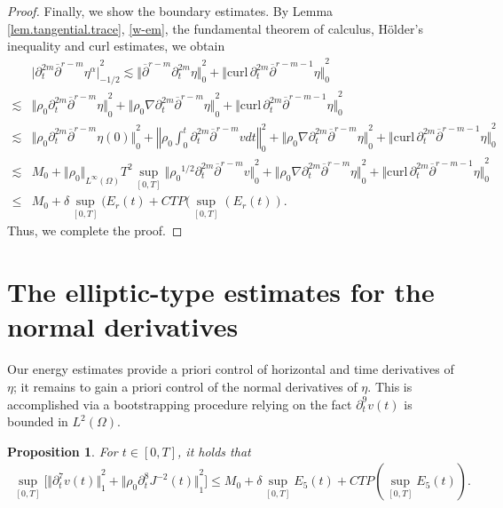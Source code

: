 \documentclass[12pt,twoside,reqno]{amsart}
\numberwithin{equation}{section}
\newtheorem{proposition}[theorem]{Proposition}
\theoremstyle{definition}
\theoremstyle{remark}
\begin{document}
\begin{proof}
Finally, we show the boundary estimates.
By Lemma \ref{lem.tangential.trace}, \eqref{w-em}, the fundamental theorem of calculus, H\"older's inequality and curl estimates, we obtain
\begin{align*}
  &{\vert{{\partial}_t^{2m}{\overline{\partial}}^{r-m} \eta^\alpha}\vert}_{-1/2}^2\lesssim {\Vert{{\overline{\partial}}^{r-m} {\partial}_t^{2m}\eta}\Vert}_0^2+{\Vert{{\mathrm{curl}\,}{\partial}_t^{2m}{\overline{\partial}}^{r-m-1}\eta}\Vert}_0^2\\
  \lesssim &{\Vert{{\rho_0}  {\partial}_t^{2m}{\overline{\partial}}^{r-m} \eta}\Vert}_0^2+{\Vert{{\rho_0} {\nabla}{\partial}_t^{2m}{\overline{\partial}}^{r-m} \eta}\Vert}_0^2+{\Vert{{\mathrm{curl}\,}{\partial}_t^{2m}{\overline{\partial}}^{r-m-1}\eta}\Vert}_0^2\\
  \lesssim & {\Vert{{\rho_0}  {\partial}_t^{2m}{\overline{\partial}}^{r-m} \eta(0)}\Vert}_0^2+{\left\Vert{{\rho_0} \int_0^t{\partial}_t^{2m}{\overline{\partial}}^{r-m} v dt}\right\Vert}_0^2+{\Vert{{\rho_0} {\nabla}{\partial}_t^{2m}{\overline{\partial}}^{r-m} \eta}\Vert}_0^2+{\Vert{{\mathrm{curl}\,}{\partial}_t^{2m}{\overline{\partial}}^{r-m-1}\eta}\Vert}_0^2\\
  \lesssim &M_0+{\Vert{\rho_0}\Vert}_{L^\infty(\Omega)} T^2\sup_{[0,T]} {\Vert{{\rho_0}^{1/2}{\partial}_t^{2m}{\overline{\partial}}^{r-m} v}\Vert}_0^2+{\Vert{{\rho_0} {\nabla}{\partial}_t^{2m}{\overline{\partial}}^{r-m} \eta}\Vert}_0^2+{\Vert{{\mathrm{curl}\,}{\partial}_t^{2m}{\overline{\partial}}^{r-m-1}\eta}\Vert}_0^2\\
  {\leqslant} &M_0+\delta\sup_{[0,T]}(E_r(t) +CTP(\sup_{[0,T]}(E_r(t)).
\end{align*}
Thus, we complete the proof.
\end{proof}

\section{The elliptic-type estimates for the normal derivatives}\label{sec.8}

Our energy estimates provide a priori control of horizontal and time derivatives of $\eta$; it remains to gain a priori control of the normal derivatives of $\eta$. This is accomplished via a bootstrapping procedure relying on the fact ${\partial}_t^{9}v(t)$ is bounded in $L^2(\Omega)$.

\begin{proposition}\label{prop.dt7v}
  For $t\in [0,T]$, it holds that
  \begin{align*}
    \sup_{[0,T]}\Big[{\Vert{{\partial}_t^{7} v(t)}\Vert}_1^2+{\Vert{{\rho_0}  {\partial}_t^8J^{-2}(t)}\Vert}_1^2\Big]{\leqslant}  M_0+\delta \sup_{[0,T]} E_5(t)+CTP(\sup_{[0,T]}E_5(t)).
  \end{align*}
\end{proposition}
\end{document}
